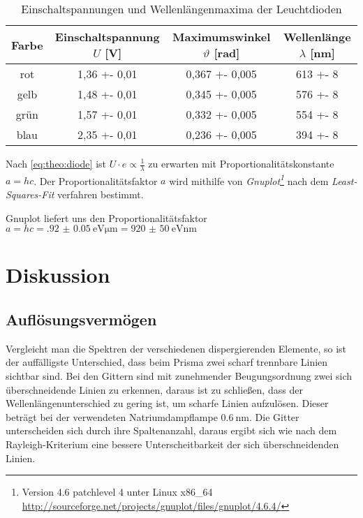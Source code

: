\begin{table}[H]
\centering
\begin{tabular}{cSSS}
	Farbe & {Einschaltspannung $ U $ [\si{\volt}]} & {Maximumswinkel $ \vartheta $ [\si{\radian}]} & {Wellenlänge $ \lambda $ [\si{\nano\meter}]} \\\hline\hline
	rot & 1,36 +- 0,01 & 0,367 +- 0,005 & 613 +- 8 \\
	gelb & 1,48 +- 0,01 & 0,345 +- 0,005 & 576 +- 8 \\
	grün & 1,57 +- 0,01 & 0,332 +- 0,005 & 554 +- 8 \\
	blau & 2,35 +- 0,01 & 0,236 +- 0,005 & 394 +- 8
\end{tabular}
\caption{Einschaltspannungen und Wellenlängenmaxima der Leuchtdioden}
\label{tab:diode}
\end{table}
Nach \eqref{eq:theo:diode} ist $ U\cdot e \propto \frac{1}{\lambda} $ zu erwarten mit Proportionalitätskonstante $ a = hc $. Der Proportionalitätsfaktor $ a $ wird mithilfe von \textit{Gnuplot\footnote{Version 4.6 patchlevel 4 unter Linux x86\_64 \url{http://sourceforge.net/projects/gnuplot/files/gnuplot/4.6.4/}}} nach dem \textit{Least-Squares-Fit} verfahren bestimmt.

\begin{figure}[H]
\centering

\caption{}
\label{fig:diode}
\end{figure}
Gnuplot liefert uns den Proportionalitätsfaktor $ a = hc = \SI{.92(5)}{\electronvolt\micro\meter} = \SI{920(50)}{\electronvolt\nano\meter} $


\newpage
\section{Diskussion} 
\subsection{Auflösungsvermögen}
Vergleicht man die Spektren der verschiedenen dispergierenden Elemente, so ist der auffälligste Unterschied, dass beim Prisma zwei scharf trennbare Linien sichtbar sind. Bei den Gittern sind mit zunehmender Beugungsordnung zwei sich überschneidende Linien zu erkennen, daraus ist zu schließen, dass der Wellenlängenunterschied zu gering ist, um scharfe Linien aufzulösen.
Dieser beträgt bei der verwendeten Natriumdampflampe $ \SI{0,6}{\nano\meter} $. Die Gitter unterscheiden sich durch ihre Spaltenanzahl, daraus ergibt sich wie nach dem Rayleigh-Kriterium eine bessere Unterscheitbarkeit der sich überschneidenden Linien. 


